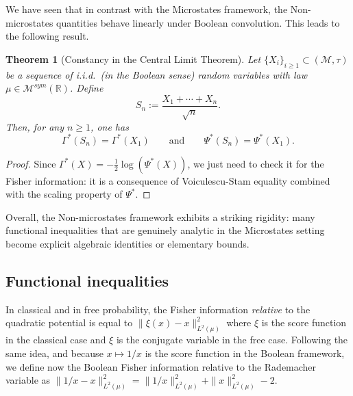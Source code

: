 \documentclass[10pt, reqno]{amsart}
\numberwithin{equation}{section}
\theoremstyle{definition}
\theoremstyle{plain}
\newtheorem{theorem}[definition]{Theorem}
\theoremstyle{remark}
\newcommand{\R}{\mathbb{R}}
\newcommand{\1}{\mathbbm{1}}
\newcommand{\probmsymr}{\mathcal{M}^{sym}(\R)}
\begin{document}
We have seen that in contrast with the Microstates framework, the Non-microstates
quantities behave linearly under Boolean convolution. This leads to the following result.

	    \begin{theorem}[Constancy in the Central Limit Theorem]\label{th:constancy}
        Let $\{X_i\}_{i\ge 1}\subset (\mathcal{M},\tau)$ be a sequence of i.i.d.\ (in the Boolean sense) random variables with law $\mu\in\probmsymr $. Define
        \begin{equation*}
            S_n:=\frac{X_1+\cdots+X_n}{\sqrt{n}}.
        \end{equation*}
        Then, for any $n\geq 1$, one has
        \[
        \Gamma^*(S_n)= \Gamma^*(X_1)
        \qquad\text{and}\qquad
        \Psi^*(S_n)= \Psi^*(X_1).
        \]
    \end{theorem}
\begin{proof}
Since $\Gamma^*(X)=-\frac{1}{2}\log(\Psi^*(X))$, we just need to check it for the Fisher information: it is a consequence of Voiculescu-Stam equality combined with the scaling property of $\Psi^*$.
\end{proof}
Overall, the Non-microstates framework exhibits a striking rigidity: many
functional inequalities that are genuinely analytic in the Microstates
setting become explicit algebraic identities or elementary bounds.
\subsection{Functional inequalities}\label{sec:nmfunctional_inequalities}In classical and in free probability, the Fisher information \textit{relative} to the quadratic potential is equal to $\|\xi(x)-x\|_{L^2(\mu)}^2$ where $\xi$ is the score function in the classical case and $\xi$ is the conjugate variable in the free case. Following the same idea, and because $x\mapsto 1/x$ is the score function in the Boolean framework, we define now the Boolean Fisher information relative to the Rademacher variable  as $\|1/x-x\|_{L^2(\mu)}^2=\|1/x\|_{L^2(\mu)}^2+\|x\|_{L^2(\mu)}^2-2$.
\end{document}
